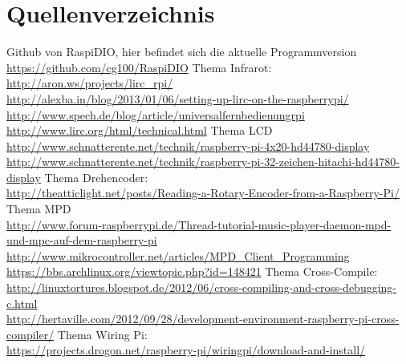\section{Quellenverzeichnis}

Github von RaspiDIO, hier befindet sich die aktuelle Programmversion\\
\url{https://github.com/cg100/RaspiDIO}
\newline
\newline
Thema Infrarot:\\
\url{http://aron.ws/projects/lirc_rpi/}\\
\url{http://alexba.in/blog/2013/01/06/setting-up-lirc-on-the-raspberrypi/}\\
\url{http://www.spech.de/blog/article/universalfernbedienungrpi}\\
\url{http://www.lirc.org/html/technical.html}
\newline
\newline
Thema LCD\\
\url{http://www.schnatterente.net/technik/raspberry-pi-4x20-hd44780-display}\\
\url{http://www.schnatterente.net/technik/raspberry-pi-32-zeichen-hitachi-hd44780-display}
\newline
\newline
Thema Drehencoder:\\
\url{http://theatticlight.net/posts/Reading-a-Rotary-Encoder-from-a-Raspberry-Pi/}
\newline
\newline
Thema MPD\\
\url{http://www.forum-raspberrypi.de/Thread-tutorial-music-player-daemon-mpd-und-mpc-auf-dem-raspberry-pi}\\
\url{http://www.mikrocontroller.net/articles/MPD_Client_Programming}\\
\url{https://bbs.archlinux.org/viewtopic.php?id=148421}
\newline
\newline
Thema Cross-Compile:\\
\url{http://linuxtortures.blogspot.de/2012/06/cross-compiling-and-cross-debugging-c.html}\\
\url{http://hertaville.com/2012/09/28/development-environment-raspberry-pi-cross-compiler/}
\newline
\newline
Thema Wiring Pi:\\
\url{https://projects.drogon.net/raspberry-pi/wiringpi/download-and-install/}\\
